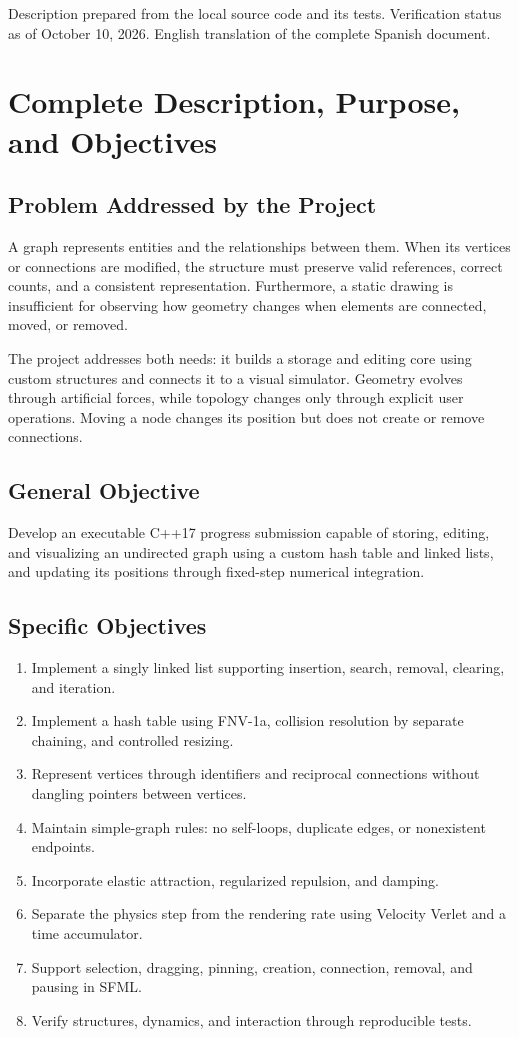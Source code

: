 \documentclass[11pt,a4paper]{article}
\begin{document}
\vfill
{\small Description prepared from the local source code and its tests. Verification status as of October 10, 2026. English translation of the complete Spanish document.}
\newpage

\section{Complete Description, Purpose, and Objectives}
\subsection{Problem Addressed by the Project}
A graph represents entities and the relationships between them. When its vertices or connections are modified, the structure must preserve valid references, correct counts, and a consistent representation. Furthermore, a static drawing is insufficient for observing how geometry changes when elements are connected, moved, or removed.

The project addresses both needs: it builds a storage and editing core using custom structures and connects it to a visual simulator. Geometry evolves through artificial forces, while topology changes only through explicit user operations. Moving a node changes its position but does not create or remove connections.

\subsection{General Objective}
Develop an executable C++17 progress submission capable of storing, editing, and visualizing an undirected graph using a custom hash table and linked lists, and updating its positions through fixed-step numerical integration.

\subsection{Specific Objectives}
\begin{enumerate}
\item Implement a singly linked list supporting insertion, search, removal, clearing, and iteration.
\item Implement a hash table using FNV-1a, collision resolution by separate chaining, and controlled resizing.
\item Represent vertices through identifiers and reciprocal connections without dangling pointers between vertices.
\item Maintain simple-graph rules: no self-loops, duplicate edges, or nonexistent endpoints.
\item Incorporate elastic attraction, regularized repulsion, and damping.
\item Separate the physics step from the rendering rate using Velocity Verlet and a time accumulator.
\item Support selection, dragging, pinning, creation, connection, removal, and pausing in SFML.
\item Verify structures, dynamics, and interaction through reproducible tests.
\end{enumerate}
\end{document}
